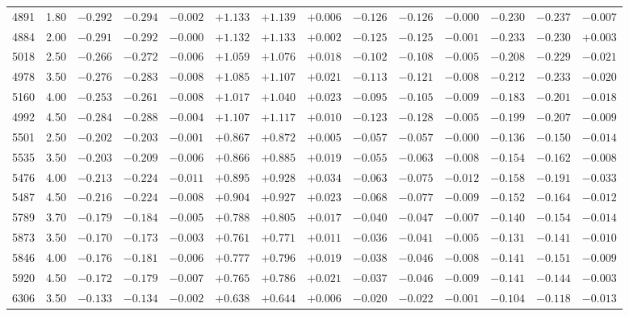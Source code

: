 \documentclass[]{aa}
\begin{document}
\begin{appendix}
\begin{table*}
\begin{center}
\begin{tabular}{llllllllllllll}
4891  &1.80 & $-0.292$ &$ -0.294$ &$ -0.002$ &$ +1.133$ &$ +1.139$ &$ +0.006$ &$ -0.126$ &$ -0.126$ &$ -0.000$ &$ -0.230$& $-0.237$& $-0.007 $\\
4884  &2.00 & $-0.291$ &$ -0.292$ &$ -0.000$ &$ +1.132$ &$ +1.133$ &$ +0.002$ &$ -0.125$ &$ -0.125$ &$ -0.001$ &$ -0.233$& $-0.230$& $+0.003 $\\
5018  &2.50 & $-0.266$ &$ -0.272$ &$ -0.006$ &$ +1.059$ &$ +1.076$ &$ +0.018$ &$ -0.102$ &$ -0.108$ &$ -0.005$ &$ -0.208$& $-0.229$& $-0.021 $\\
4978  &3.50 & $-0.276$ &$ -0.283$ &$ -0.008$ &$ +1.085$ &$ +1.107$ &$ +0.021$ &$ -0.113$ &$ -0.121$ &$ -0.008$ &$ -0.212$& $-0.233$& $-0.020 $\\
5160  &4.00 & $-0.253$ &$ -0.261$ &$ -0.008$ &$ +1.017$ &$ +1.040$ &$ +0.023$ &$ -0.095$ &$ -0.105$ &$ -0.009$ &$ -0.183$& $-0.201$& $-0.018 $\\
4992  &4.50 & $-0.284$ &$ -0.288$ &$ -0.004$ &$ +1.107$ &$ +1.117$ &$ +0.010$ &$ -0.123$ &$ -0.128$ &$ -0.005$ &$ -0.199$& $-0.207$& $-0.009 $\\
5501  &2.50 & $-0.202$ &$ -0.203$ &$ -0.001$ &$ +0.867$ &$ +0.872$ &$ +0.005$ &$ -0.057$ &$ -0.057$ &$ -0.000$ &$ -0.136$& $-0.150$& $-0.014 $\\
5535  &3.50 & $-0.203$ &$ -0.209$ &$ -0.006$ &$ +0.866$ &$ +0.885$ &$ +0.019$ &$ -0.055$ &$ -0.063$ &$ -0.008$ &$ -0.154$& $-0.162$& $-0.008 $\\
5476  &4.00 & $-0.213$ &$ -0.224$ &$ -0.011$ &$ +0.895$ &$ +0.928$ &$ +0.034$ &$ -0.063$ &$ -0.075$ &$ -0.012$ &$ -0.158$& $-0.191$& $-0.033 $\\
5487  &4.50 & $-0.216$ &$ -0.224$ &$ -0.008$ &$ +0.904$ &$ +0.927$ &$ +0.023$ &$ -0.068$ &$ -0.077$ &$ -0.009$ &$ -0.152$& $-0.164$& $-0.012 $\\
5789  &3.70 & $-0.179$ &$ -0.184$ &$ -0.005$ &$ +0.788$ &$ +0.805$ &$ +0.017$ &$ -0.040$ &$ -0.047$ &$ -0.007$ &$ -0.140$& $-0.154$& $-0.014 $\\
5873  &3.50 & $-0.170$ &$ -0.173$ &$ -0.003$ &$ +0.761$ &$ +0.771$ &$ +0.011$ &$ -0.036$ &$ -0.041$ &$ -0.005$ &$ -0.131$& $-0.141$& $-0.010 $\\
5846  &4.00 & $-0.176$ &$ -0.181$ &$ -0.006$ &$ +0.777$ &$ +0.796$ &$ +0.019$ &$ -0.038$ &$ -0.046$ &$ -0.008$ &$ -0.141$& $-0.151$& $-0.009 $\\
5920  &4.50 & $-0.172$ &$ -0.179$ &$ -0.007$ &$ +0.765$ &$ +0.786$ &$ +0.021$ &$ -0.037$ &$ -0.046$ &$ -0.009$ &$ -0.141$& $-0.144$& $-0.003 $\\
6306  &3.50 & $-0.133$ &$ -0.134$ &$ -0.002$ &$ +0.638$ &$ +0.644$ &$ +0.006$ &$ -0.020$ &$ -0.022$ &$ -0.001$ &$ -0.104$& $-0.118$& $-0.013 $\\

\end{tabular}
\end{center}
\end{table*}
\end{appendix}
\end{document}
